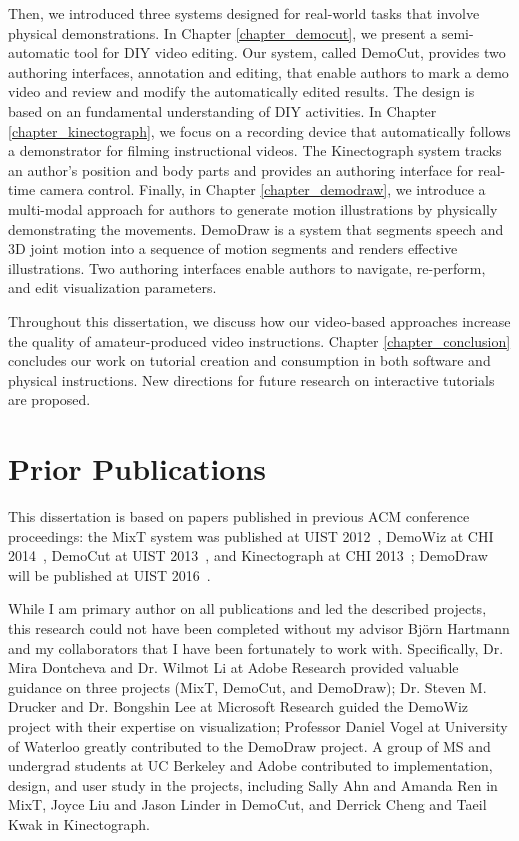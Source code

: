 Then, we introduced three systems designed for real-world tasks that involve physical demonstrations.
In Chapter \ref{chapter_democut}, we present a semi-automatic tool for DIY video editing. Our system, called DemoCut, provides two authoring interfaces, annotation and editing, that enable authors to mark a demo video and review and modify the automatically edited results. The design is based on an fundamental understanding of DIY activities.
In Chapter \ref{chapter_kinectograph}, we focus on a recording device that automatically follows a demonstrator for filming instructional videos. The Kinectograph system tracks an author's position and body parts and provides an authoring interface for real-time camera control.
Finally, in Chapter \ref{chapter_demodraw}, we introduce a multi-modal approach for authors to generate motion illustrations by physically demonstrating the movements. DemoDraw is a system that segments speech and 3D joint motion into a sequence of motion segments and renders effective illustrations. Two authoring interfaces enable authors to navigate, re-perform, and edit visualization parameters.

Throughout this dissertation, we discuss how our video-based approaches increase the quality of amateur-produced video instructions. Chapter \ref{chapter_conclusion} concludes our work on tutorial creation and consumption in both software and physical instructions. New directions for future research on interactive tutorials are proposed.


\section {Prior Publications}

This dissertation is based on papers published in previous ACM conference proceedings: the MixT system was published at UIST 2012~\cite{Chi:2012:MAG:2380116.2380130}, DemoWiz at CHI 2014~\cite{Chi:2014:DRS:2556288.2557254}, DemoCut at UIST 2013~\cite{Chi:2013:DGC:2501988.2502052}, and Kinectograph at CHI 2013~\cite{Cheng:2013:BCC:2468356.2468568}; DemoDraw will be published at UIST 2016~\cite{Chi:2016:DemoDraw}.

While I am primary author on all publications and led the described projects, this research could not have been completed without my advisor Bj\"orn Hartmann and my collaborators that I have been fortunately to work with. Specifically, Dr. Mira Dontcheva and Dr. Wilmot Li at Adobe Research provided valuable guidance on three projects (MixT, DemoCut, and DemoDraw); Dr. Steven M. Drucker and Dr. Bongshin Lee at Microsoft Research guided the DemoWiz project with their expertise on visualization; Professor Daniel Vogel at University of Waterloo greatly contributed to the DemoDraw project. A group of MS and undergrad students at UC Berkeley and Adobe contributed to implementation, design, and user study in the projects, including Sally Ahn and Amanda Ren in MixT, Joyce Liu and Jason Linder in DemoCut, and Derrick Cheng and Taeil Kwak in Kinectograph.
